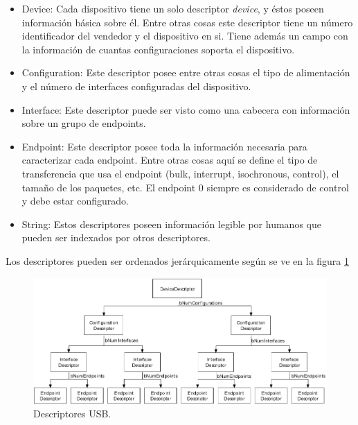 \begin{itemize}
 \item Device: Cada dispositivo tiene un solo descriptor \emph{device}, y
\'estos poseen informaci\'on b\'asica sobre \'el. Entre otras cosas este
descriptor tiene un n\'umero identificador del vendedor y el dispositivo en
si. Tiene adem\'as un campo con la informaci\'on de cuantas configuraciones
soporta el dispositivo.

 \item Configuration: Este descriptor posee entre otras cosas el tipo de
alimentaci\'on y el n\'umero de interfaces configuradas del dispositivo.

 \item Interface: Este descriptor puede ser visto como una cabecera con
informaci\'on sobre un grupo de endpoints.

 \item Endpoint: Este descriptor posee toda la informaci\'on necesaria para
caracterizar cada endpoint. Entre otras cosas aqu\'i se define el tipo de
transferencia que usa el endpoint (bulk, interrupt, isochronous, control), el
tama\~no de los paquetes, etc. El endpoint 0 siempre es considerado de control
y debe estar configurado.

 \item String: Estos descriptores poseen informaci\'on legible por humanos que
pueden ser indexados por otros descriptores. 

\end{itemize}

Los descriptores pueden ser ordenados jer\'arquicamente seg\'un se ve en la
figura \ref{fig:usb_descriptors}

\begin{figure}[htp]
\centering
\includegraphics[scale=0.4]{./img/usb_descriptors.png}
\caption{Descriptores USB.}
\label{fig:usb_descriptors}
\end{figure}

\clearpage
